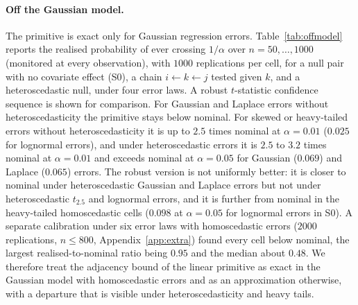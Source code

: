 \paragraph{Off the Gaussian model.} The primitive is exact only for Gaussian
regression errors. Table~\ref{tab:offmodel} reports the realised probability
of ever crossing $1/\alpha$ over $n=50,\dots,1000$ (monitored at every
observation), with $1000$ replications per cell, for a null pair with no
covariate effect (S0), a chain $i\leftarrow k\leftarrow j$ tested given $k$, and
a heteroscedastic null, under four error laws. A robust $t$-statistic
confidence sequence \citep{lindon2026anytime} is shown for comparison. For
Gaussian and Laplace errors without heteroscedasticity the primitive stays
below nominal. For skewed or heavy-tailed errors without
heteroscedasticity it is up to $2.5$ times nominal at $\alpha=0.01$ ($0.025$ for
lognormal errors), and under heteroscedastic errors it is $2.5$ to $3.2$ times
nominal at $\alpha=0.01$ and exceeds nominal at $\alpha=0.05$ for Gaussian
($0.069$) and Laplace ($0.065$) errors. The robust version is not uniformly
better: it is closer to nominal under heteroscedastic Gaussian and Laplace errors
but not under heteroscedastic $t_{2.5}$ and lognormal errors, and it is further
from nominal in the heavy-tailed homoscedastic cells ($0.098$ at $\alpha=0.05$ for
lognormal errors in S0). A separate calibration under six error laws with
homoscedastic errors ($2000$ replications, $n\le800$, Appendix~\ref{app:extra})
found every cell below nominal, the largest realised-to-nominal ratio being $0.95$
and the median about $0.48$. We therefore treat the adjacency bound of the linear
primitive as exact in the Gaussian model with homoscedastic errors and as an
approximation otherwise, with a departure that is visible under heteroscedasticity
and heavy tails.

